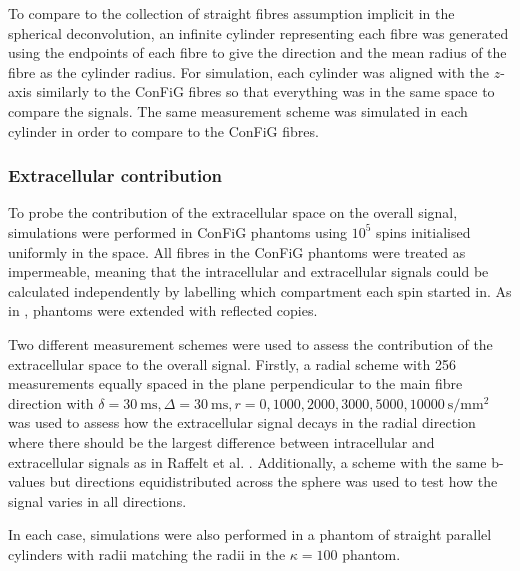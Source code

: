 To compare to the collection of straight fibres assumption implicit in the spherical deconvolution, an infinite cylinder representing each fibre was generated using the endpoints of each fibre to give the direction and the mean radius of the fibre as the cylinder radius. For simulation, each cylinder was aligned with the $z$-axis similarly to the ConFiG fibres so that everything was in the same space to compare the signals. The same measurement scheme was simulated in each cylinder in order to compare to the \ac{ConFiG} fibres.


\subsubsection{Extracellular contribution}
\label{sec:frf_method_extra}
To probe the contribution of the extracellular space on the overall signal, simulations were performed in \ac{ConFiG} phantoms using $10^5$ spins initialised uniformly in the space.
All fibres in the \ac{ConFiG} phantoms were treated as impermeable, meaning that the intracellular and extracellular signals could be calculated independently by labelling which compartment each spin started in. As in , phantoms were extended with reflected copies.

Two different measurement schemes were used to assess the contribution of the extracellular space to the overall signal. Firstly, a radial scheme with 256 measurements equally spaced in the plane perpendicular to the main fibre direction with $\delta=\SI{30}{\milli\second}, \Delta=\SI{30}{\milli\second}, r = 0, 1000, 2000, 3000, 5000, \SI{10000}{\second\per\milli\metre\squared}$ was used to assess how the extracellular signal decays in the radial direction where there should be the largest difference between intracellular and extracellular signals as in Raffelt et al. \cite{Raffelt2012}. Additionally, a scheme with the same b-values but directions equidistributed across the sphere was used to test how the signal varies in all directions.


In each case, simulations were also performed in a phantom of straight parallel cylinders with radii matching the radii in the $\kappa=100$ phantom.

